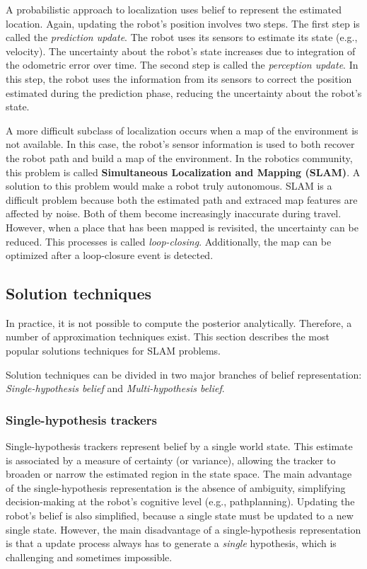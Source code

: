 {A probabilistic approach to localization uses belief to represent the estimated location.
Again, updating the robot's position involves two steps.
The first step is called the \textit{prediction update}. The robot uses its sensors to estimate its state (e.g., velocity). The uncertainty about the robot's state increases due to integration of the odometric error over time.
The second step is called the \textit{perception update}.  
In this step, the robot uses the information from its sensors to correct the position estimated during the prediction phase, reducing the uncertainty about the robot's state.

A more difficult subclass of localization occurs when a map of the environment is not available.
In this case, the robot's sensor information is used to both recover the robot path and build a map of the environment.
In the robotics community, this problem is called \textbf{Simultaneous Localization and Mapping (SLAM)}.
A solution to this problem would make a robot truly autonomous.
SLAM is a difficult problem because both the estimated path and extraced map features are affected by noise.
Both of them become increasingly inaccurate during travel.
However, when a place that has been mapped is revisited, the uncertainty can be reduced.
This processes is called \textit{loop-closing}.
Additionally, the map can be optimized after a loop-closure event is detected.


\subsection{Solution techniques}
In practice, it is not possible to compute the posterior analytically.
Therefore, a number of approximation techniques exist. 
This section describes the most popular solutions techniques for SLAM problems.

Solution techniques can be divided in two major branches of belief representation: \textit{Single-hypothesis belief} and \textit{Multi-hypothesis belief}.


\subsubsection{Single-hypothesis trackers}
Single-hypothesis trackers represent belief by a single world state.
This estimate is associated by a measure of certainty (or variance), allowing the tracker to broaden or narrow the estimated region in the state space.
The main advantage of the single-hypothesis representation is the absence of ambiguity, simplifying decision-making at the robot's cognitive level (e.g., pathplanning).
Updating the robot's belief is also simplified, because a single state must be updated to a new single state.
However, the main disadvantage of a single-hypothesis representation is that a update process always has to generate a \textit{single} hypothesis, which is challenging and sometimes impossible.

}
